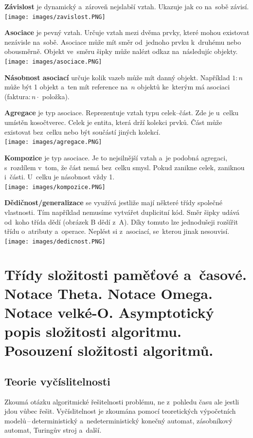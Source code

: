 \textbf{Závislost} je dynamický a~zároveň nejslabší vztah. Ukazuje jak co na~sobě závisí. \\
\texttt{[image: images/zavislost.PNG]}

\textbf{Asociace} je pevný vztah. Určuje vztah mezi dvěma prvky, které mohou existovat nezávisle na~sobě. Asociace může mít směr od~jednoho prvku k~druhému nebo obousměrně. Objekt ve~směru šipky může nalézt odkaz na~následujíc objekty. \\
\texttt{[image: images/asociace.PNG]}

\textbf{Násobnost asociací} určuje kolik vazeb může mít danný objekt. Například $1:n$ může být 1 objekt a~ten mít reference na~$n$ objektů ke~kterým má asociaci (faktura$:n \cdot$ položka).

\textbf{Agregace} je typ asociace. Reprezentuje vztah typu celek--část. Zde je u~celku umístěn kosočtverec. Celek je entita, která drží kolekci prvků. Část může existovat bez~celku nebo být součástí jiných kolekcí. \\
\texttt{[image: images/agregace.PNG]}

\textbf{Kompozice} je typ asociace. Je to nejsilnější vztah a~je podobná agregaci, s~rozdílem v~tom, že část nemá bez~celku smysl. Pokud zanikne celek, zaniknou i~části. U~celku je násobnost vždy 1. \\
\texttt{[image: images/kompozice.PNG]}

\textbf{Dědičnost/generalizace} se využívá jestliže mají některé třídy společné vlastnosti. Tím například nemusíme vytvářet duplicitní kód. Směr šipky udává od~koho třída dědí (obrázek B dědí z~A). Díky tomuto lze jednodušeji rozšířit třídu o~atributy a~operace. Neplést si z~asociací, se~kterou jinak nesouvisí. \\
\texttt{[image: images/dedicnost.PNG]}

\clearpage
\section{Třídy složitosti paměťové a~časové. Notace Theta. Notace Omega. Notace velké-O. Asymptotický popis složitosti algoritmu. Posouzení složitosti algoritmů.}

\subsection{Teorie vyčíslitelnosti}

Zkoumá otázku algoritmické řešitelnosti problému, ne z~pohledu času ale jestli jdou vůbec řešit. Vyčíslitelnost je zkoumána pomocí teoretických výpočetních modelů\,--\,deterministický a~nedeterministický konečný automat, zásobníkový automat, Turingův stroj a~další.

